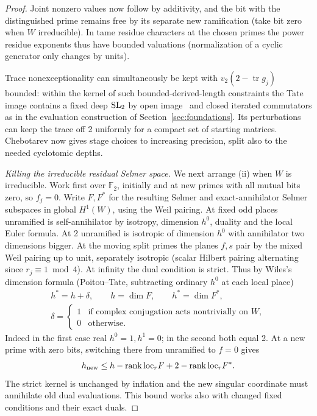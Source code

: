 \begin{proof}
Joint nonzero values now follow by additivity, and the bit with the distinguished prime remains free by its separate new ramification (take bit zero when \(W\) irreducible). In tame residue characters at the chosen primes the power residue exponents thus have bounded valuations (normalization of a cyclic generator only changes by units). 

Trace nonexceptionality can simultaneously be kept with \(v_2(2-\operatorname{tr} g_j)\) bounded: within the kernel of such bounded-derived-length constraints the Tate image contains a fixed deep \({\rm SL}_2\) by open image~\cite{Serre72} and closed iterated commutators as in the evaluation construction of Section~\ref{sec:foundations}. Its perturbations can keep the trace off 2 uniformly for a compact set of starting matrices. Chebotarev now gives stage choices to increasing precision, split also to the needed cyclotomic depths.

\emph{Killing the irreducible residual Selmer space.}
We next arrange (ii) when \(W\) is irreducible. Work first over \(\mathbb F_2\), initially and at new primes with all mutual bits zero, so \(f_j=0\). Write \(F,F^*\) for the resulting Selmer and exact-annihilator Selmer subspaces in global \(H^1(W)\), using the Weil pairing. At fixed odd places unramified is self-annihilator by isotropy, dimension \(h^0\), duality and the local Euler formula. At 2 unramified is isotropic of dimension \(h^0\) with annihilator two dimensions bigger. At the moving split primes the planes \(f,s\) pair by the mixed Weil pairing up to unit, separately isotropic (scalar Hilbert pairing alternating since \(r_j\equiv1\bmod4\)). At infinity the dual condition is strict. Thus by Wiles's dimension formula (Poitou--Tate, subtracting ordinary \(h^0\) at each local place)
\[
\begin{gathered}
          h^*=h+\delta,\qquad h=\dim F,\qquad h^*=\dim F^*,\\[3pt]
 \delta=\begin{cases}
 1&\text{if complex conjugation acts nontrivially on }W,\\
 0&\text{otherwise}.
 \end{cases}
\end{gathered}
\]
Indeed in the first case real \(h^0=1,h^1=0\); in the second both equal 2. At a new prime with zero bits, switching there from unramified to \(f=0\) gives
\[
             h_{\rm new}\le h-\operatorname{rank}{\rm loc}_r F
                              +2-\operatorname{rank}{\rm loc}_r F^* .
\]
The strict kernel is unchanged by inflation and the new singular coordinate must annihilate old dual evaluations. This bound works also with changed fixed conditions and their exact duals.


\end{proof}
